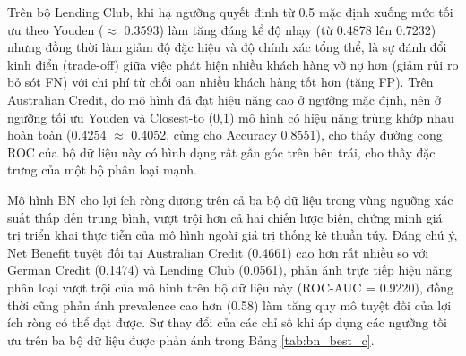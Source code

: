 \noindent
Trên bộ Lending Club, khi hạ ngưỡng quyết định từ 0.5 mặc định xuống mức tối ưu theo Youden ($\approx$ 0.3593) làm tăng đáng kể độ nhạy (từ 0.4878 lên 0.7232) nhưng đồng thời làm giảm độ đặc hiệu và độ chính xác tổng thể,  là sự đánh đổi kinh điển (trade-off) giữa việc phát hiện nhiều khách hàng vỡ nợ hơn (giảm rủi ro bỏ sót  FN) với chi phí từ chối oan nhiều khách hàng tốt hơn (tăng FP). Trên Australian Credit, do mô hình đã đạt hiệu năng cao ở ngưỡng mặc định, nên ở ngưỡng tối ưu Youden và Closest-to (0,1) mô hình có hiệu năng trùng khớp nhau hoàn toàn (0.4254 $\approx$ 0.4052, cùng cho Accuracy 0.8551), cho thấy đường cong ROC của bộ dữ liệu này có hình dạng rất gần góc trên bên trái, cho thấy đặc trưng của một bộ phân loại mạnh.

Mô hình BN cho lợi ích ròng dương trên cả ba bộ dữ liệu trong vùng ngưỡng xác suất thấp đến trung bình, vượt trội hơn cả hai chiến lược biên, chứng minh giá trị triển khai thực tiễn của mô hình ngoài giá trị thống kê thuần túy. Đáng chú ý, Net Benefit tuyệt đối tại Australian Credit (0.4661) cao hơn rất nhiều so với German Credit (0.1474) và Lending Club (0.0561), phản ánh trực tiếp hiệu năng phân loại vượt trội của mô hình trên bộ dữ liệu này (ROC-AUC = 0.9220), đồng thời cũng phản ánh prevalence cao hơn (0.58) làm tăng quy mô tuyệt đối của lợi ích ròng có thể đạt được. Sự thay đổi của các chỉ số khi áp dụng các ngưỡng tối ưu trên ba bộ dữ liệu được phản ánh trong Bảng \ref{tab:bn_best_c}.

